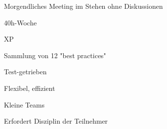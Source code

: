 \documentclass[a4paper]{article}
\begin{document}
\begin{multicols}{3}
\begin{itemize*}
\begin{itemize*}
          \end{itemize*}
    \item Morgendliches Meeting im Stehen ohne Diskussionen
    \item 40h-Woche
    \item XP
          \begin{itemize*}
            \item Sammlung von 12 "best practices"
            \item Test-getrieben
            \item Flexibel, effizient
            \item Kleine Teams
            \item Erfordert Disziplin der Teilnehmer
          \end{itemize*}
  \end{itemize*}


\end{multicols}
\end{document}
